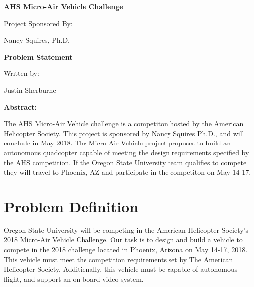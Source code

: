 \documentclass[letterpaper,10pt,titlepage]{article}
\begin{document}
\begin{titlepage}
\begin{center}
\vspace*{3cm}
\huge{\textbf{AHS Micro-Air Vehicle Challenge}}\par
\vspace{1cm}
\large{Project Sponsored By:}\par
\vspace{3mm}
\normalsize{Nancy Squires, Ph.D.}\par
\vspace{1cm}
\huge{\textbf{Problem Statement}}\par
\vspace{1cm}
\large{Written by:}\par
\vspace{3mm}
\normalsize{Justin Sherburne}\par
\vspace{25mm}
\large{\textbf{Abstract:}}\par
\vspace{4mm}
\normalsize{The AHS Micro-Air Vehicle challenge is a competiton hosted by the 
American Helicopter Society. This project is sponsored by Nancy Squires Ph.D., 
and will conclude in May 2018. The Micro-Air Vehicle project proposes to build 
an autonomous quadcopter capable of meeting the design requirements specified 
by the AHS competition. If the Oregon State University team qualifies to 
compete they will travel to Phoenix, AZ and participate in the competiton 
on May 14-17.}
\end{center}
\end{titlepage}

\setlength\parindent{4mm}
\section*{Problem Definition}\par
\hspace{4ex}Oregon State University will be competing in the American Helicopter 
Society's 2018 Micro-Air Vehicle Challenge. Our task is to design and build 
a vehicle to compete in the 2018 challenge located in Phoenix, Arizona on May 
14-17, 2018. This vehicle must meet the competition requirements set by The 
American Helicopter Society. Additionally, this vehicle must be capable of 
autonomous flight, and support an on-board video system. 
\end{document}
